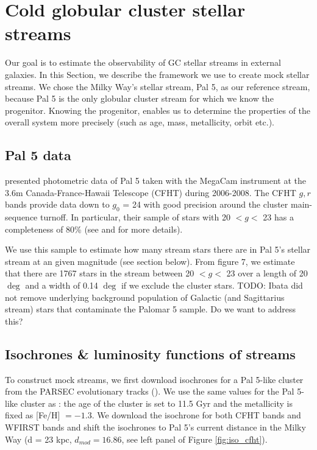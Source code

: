 \documentclass[twocolumn]{aastex62}
\newcommand{\todo}[1]{{\color{red} TODO: #1}}
\begin{document}
\section{Cold globular cluster stellar streams}
\label{sec:coldstreams}
Our goal is to estimate the observability of GC stellar streams in external galaxies. In this Section, we describe the framework we use to create mock stellar streams.  We chose the Milky Way's stellar stream, Pal 5,  as our reference stream, because Pal 5 is the only globular cluster stream for which we know the progenitor. Knowing the progenitor, enables us to determine the properties of the overall system more precisely (such as age, mass, metallicity, orbit etc.). 

\subsection{Pal 5 data}
\label{sec:pal5}
 \citet{ibata16} presented photometric data of Pal 5 taken with the MegaCam instrument at the 3.6m Canada-France-Hawaii Telescope (CFHT) during 2006-2008. The CFHT $g, r$ bands provide data down to $g_0$ = 24 with good precision around the cluster main-sequence turnoff. In particular, their sample of stars with 20 $< g <$ 23 has a completeness of 80\% (see \citealt{ibata16} and \citealt{ibata17} for more details). 
 
We use this sample to estimate how many stream stars there are in Pal 5's stellar stream at an given magnitude (see section below). From \citet{ibata16} figure 7, we estimate that there are 1767 stars in the stream between 20 $< g <$ 23 over a length of 20 $\deg$  and a width of 0.14 $\deg$ if we exclude the cluster stars. \todo{Ibata did not remove underlying background population of Galactic (and Sagittarius stream) stars that contaminate the Palomar 5 sample. Do we want to address this?}  

\subsection{Isochrones \& luminosity functions of streams}
\label{sec:lum}
To construct mock streams, we first download isochrones for a Pal 5-like cluster from the PARSEC evolutionary tracks (\citealt{bressan12}). We use the same values for the Pal 5-like cluster as \citet{ibata17}: the age of the cluster is set to 11.5 Gyr and the metallicity is fixed as [Fe/H] $= -1.3$. We download the isochrone for both CFHT bands and WFIRST bands and shift the isochrones to Pal 5's current distance in the Milky Way (d = 23 kpc, $d_{mod} = 16.86$, see left panel of Figure \ref{fig:iso_cfht}). 
\end{document}
